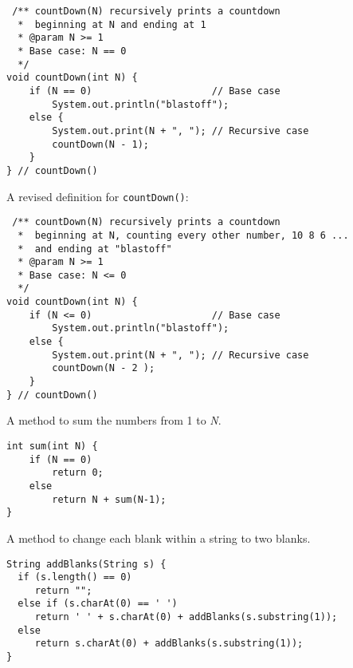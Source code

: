 \begin{ANS}
\begin{jjjlisting}
\begin{lstlisting}
 /** countDown(N) recursively prints a countdown 
  *  beginning at N and ending at 1
  * @param N >= 1
  * Base case: N == 0
  */
void countDown(int N) {
    if (N == 0)                     // Base case
        System.out.println("blastoff");
    else {
        System.out.print(N + ", "); // Recursive case
        countDown(N - 1);
    }
} // countDown()
\end{lstlisting}
\end{jjjlisting}

\item  A revised definition for {\tt countDown()}:

\begin{jjjlisting}
\begin{lstlisting}
 /** countDown(N) recursively prints a countdown  
  *  beginning at N, counting every other number, 10 8 6 ...  
  *  and ending at "blastoff"
  * @param N >= 1
  * Base case: N <= 0
  */
void countDown(int N) {
    if (N <= 0)                     // Base case
        System.out.println("blastoff");
    else {
        System.out.print(N + ", "); // Recursive case
        countDown(N - 2 );
    }
} // countDown()
\end{lstlisting}
\end{jjjlisting}

\item  A method to sum the numbers from 1 to {\it N}.

\begin{jjjlisting}
\begin{lstlisting}
int sum(int N) {
    if (N == 0)
        return 0;
    else
        return N + sum(N-1);
}
\end{lstlisting}
\end{jjjlisting}

\item  A method to change each blank within a string
to two blanks.

\begin{jjjlisting}
\begin{lstlisting}
String addBlanks(String s) {
  if (s.length() == 0)
     return "";
  else if (s.charAt(0) == ' ')
     return ' ' + s.charAt(0) + addBlanks(s.substring(1));
  else
     return s.charAt(0) + addBlanks(s.substring(1));
}
\end{lstlisting}
\end{jjjlisting}


\end{ANS}
